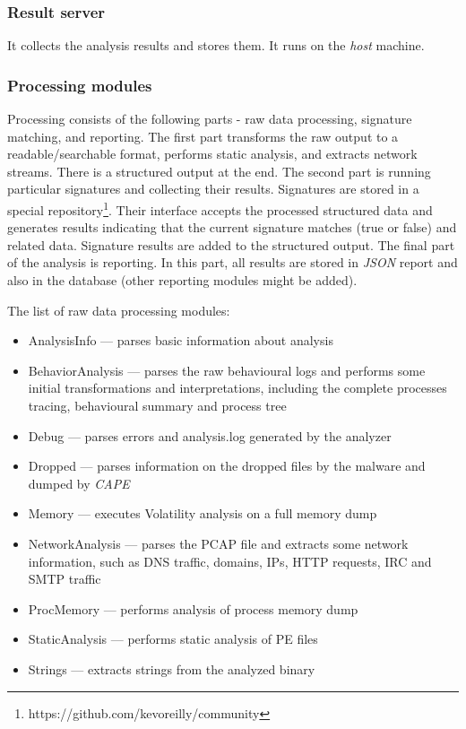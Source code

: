 \subsubsection*{Result server}
It collects the analysis results and stores them. It runs on the \emph{host} machine.

\subsubsection*{Processing modules}
Processing consists of the following parts - raw data processing, signature matching, and reporting. The first part transforms the raw output to a readable/searchable format, performs static analysis, and extracts network streams. There is a structured output at the end. The second part is running particular signatures and collecting their results. Signatures are stored in a special repository\footnote{https://github.com/kevoreilly/community}. Their interface accepts the processed structured data and generates results indicating that the current signature matches (true or false) and related data. Signature results are added to the structured output. The final part of the analysis is reporting. In this part, all results are stored in \emph{JSON} report and also in the database (other reporting modules might be added).

The list of raw data processing modules:
\begin{itemize}
  \itemsep0em 
  \item AnalysisInfo --- parses basic information about analysis
  \item BehaviorAnalysis --- parses the raw behavioural logs and performs some initial transformations and interpretations, including the complete processes tracing, behavioural summary and process tree
  \item Debug --- parses errors and analysis.log generated by the analyzer
  \item Dropped --- parses information on the dropped files by the malware and dumped by \emph{CAPE}
  \item Memory --- executes Volatility analysis on a full memory dump
  \item NetworkAnalysis --- parses the PCAP file and extracts some network information, such as DNS traffic, domains, IPs, HTTP requests, IRC and SMTP traffic
  \item ProcMemory ---  performs analysis of process memory dump
  \item StaticAnalysis ---  performs static analysis of PE files
  \item Strings ---  extracts strings from the analyzed binary
\end{itemize}

